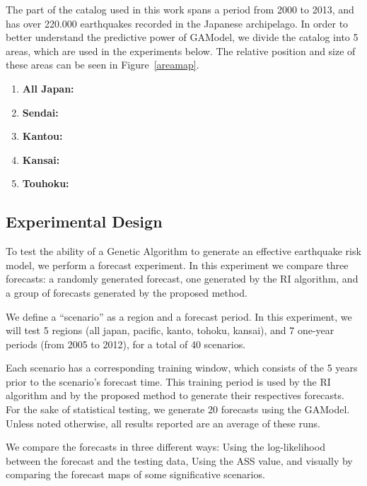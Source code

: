 \documentclass{sig-alternate}
\begin{document}
The part of the catalog used in this work spans a period from 2000 to
2013, and has over 220.000 earthquakes recorded in the Japanese
archipelago. In order to better understand the predictive power of
GAModel, we divide the catalog into 5 areas, which are used in the
experiments below. The relative position and size of these areas can
be seen in Figure~\ref{areamap}.

\begin{enumerate}
  \item {\bf All Japan:}
  \item {\bf Sendai:}
  \item {\bf Kantou:}
  \item {\bf Kansai:}
  \item {\bf Touhoku:}
\end{enumerate}


\subsection{Experimental Design} %

To test the ability of a Genetic Algorithm to generate an effective
earthquake risk model, we perform a forecast experiment. In this
experiment we compare three forecasts: a randomly generated forecast,
one generated by the RI algorithm, and a group of forecasts generated
by the proposed method.

We define a ``scenario'' as a region and a forecast period. In this
experiment, we will test 5 regions (all japan, pacific, kanto, tohoku,
kansai), and 7 one-year periods (from 2005 to 2012), for a total of 40
scenarios.

Each scenario has a corresponding training window, which consists of
the 5 years prior to the scenario's forecast time. This training
period is used by the RI algorithm and by the proposed method to
generate their respectives forecasts. For the sake of statistical
testing, we generate 20 forecasts using the GAModel. Unless noted
otherwise, all results reported are an average of these runs.

We compare the forecasts in three different ways: Using the
log-likelihood between the forecast and the testing data, Using the
ASS value, and visually by comparing the forecast maps of some
significative scenarios.
\end{document}

